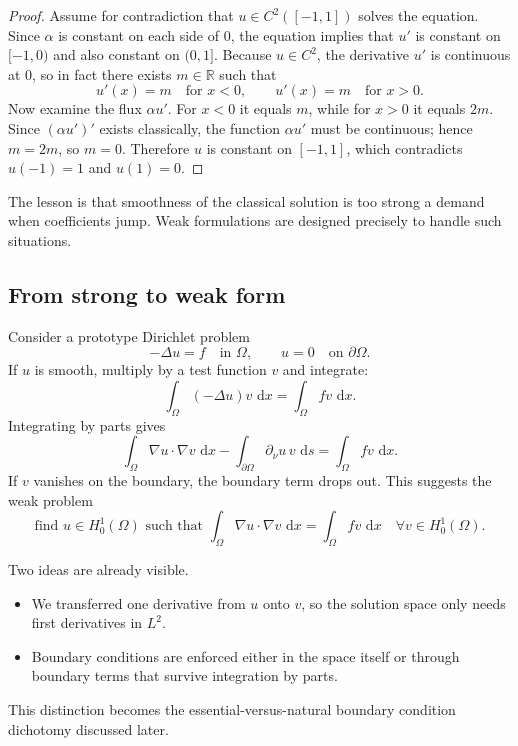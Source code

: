 \documentclass[11pt]{article}
\theoremstyle{definition}
\newcommand{\R}{\mathbb{R}}
\newcommand{\grad}{\nabla}
\newcommand{\dd}{\,\mathrm{d}}
\begin{document}
\begin{proof}
Assume for contradiction that $u\in C^2([-1,1])$ solves the equation. Since $\alpha$ is constant on each side of $0$, the equation implies that $u'$ is constant on $[-1,0)$ and also constant on $(0,1]$. Because $u\in C^2$, the derivative $u'$ is continuous at $0$, so in fact there exists $m\in\R$ such that
\[
 u'(x)=m \quad \text{for } x<0, \qquad u'(x)=m \quad \text{for } x>0.
\]
Now examine the flux $\alpha u'$. For $x<0$ it equals $m$, while for $x>0$ it equals $2m$. Since $(\alpha u')'$ exists classically, the function $\alpha u'$ must be continuous; hence $m=2m$, so $m=0$. Therefore $u$ is constant on $[-1,1]$, which contradicts $u(-1)=1$ and $u(1)=0$.
\end{proof}

The lesson is that smoothness of the classical solution is too strong a demand when coefficients jump. Weak formulations are designed precisely to handle such situations.

\subsection{From strong to weak form}

Consider a prototype Dirichlet problem
\[
-\Delta u = f \quad \text{in } \Omega,\qquad u=0 \quad \text{on } \partial\Omega.
\]
If $u$ is smooth, multiply by a test function $v$ and integrate:
\[
\int_\Omega (-\Delta u)v\,\dd x = \int_\Omega fv\,\dd x.
\]
Integrating by parts gives
\[
\int_\Omega \grad u\cdot \grad v\,\dd x - \int_{\partial\Omega} \partial_\nu u\,v\,\dd s = \int_\Omega fv\,\dd x.
\]
If $v$ vanishes on the boundary, the boundary term drops out. This suggests the weak problem
\[
\text{find } u\in H_0^1(\Omega) \text{ such that } \int_\Omega \grad u\cdot \grad v\,\dd x = \int_\Omega fv\,\dd x
\quad \forall v\in H_0^1(\Omega).
\]

Two ideas are already visible.
\begin{itemize}
    \item We transferred one derivative from $u$ onto $v$, so the solution space only needs first derivatives in $L^2$.
    \item Boundary conditions are enforced either in the space itself or through boundary terms that survive integration by parts.
\end{itemize}

This distinction becomes the essential-versus-natural boundary condition dichotomy discussed later.
\end{document}
